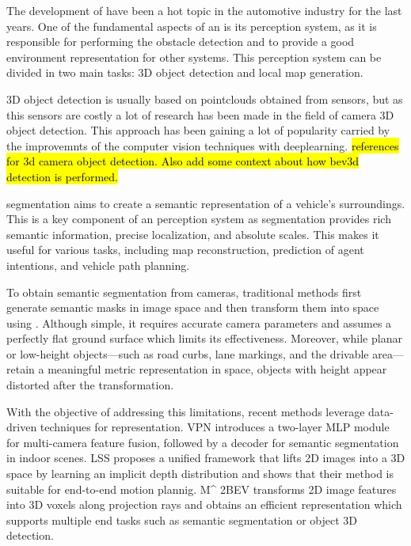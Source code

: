 
The development of  have been a hot topic in the automotive industry for the last years. One of the fundamental aspects of an  is its perception system, as it is responsible for performing the obstacle detection and to provide a good environment representation for other systems. This perception system can be divided in two main tasks: 3D object detection and local  map generation. 

3D object detection is usually based on pointclouds obtained from  sensors, but as this sensors are costly a lot of research has been made in the field of camera 3D object detection. This approach has been gaining a lot of popularity carried by the improvemnts of the computer vision techniques with deeplearning. \hl{references for 3d camera object detection. Also add some context about how bev3d detection is performed.}

 segmentation aims to create a semantic representation of a vehicle's surroundings. This is a key component of an  perception system as  segmentation provides rich semantic information, precise localization, and absolute scales. This makes it useful for various tasks, including map reconstruction, prediction of agent intentions, and vehicle path planning.

To obtain  semantic segmentation from cameras, traditional methods first generate semantic masks in image space and then transform them into  space using . Although simple, it requires accurate camera parameters and assumes a perfectly flat ground surface which limits its effectiveness. Moreover, while planar or low-height objects—such as road curbs, lane markings, and the drivable area—retain a meaningful metric representation in  space, objects with height appear distorted after the transformation.

With the objective of addressing this limitations, recent methods leverage data-driven techniques for  representation. VPN \cite{view_parsing_network} introduces a two-layer MLP module for multi-camera feature fusion, followed by a decoder for semantic segmentation in indoor scenes. LSS \cite{lift_splat_shoot} proposes a unified framework that lifts 2D images into a 3D space by learning an implicit depth distribution and shows that their method is suitable for end-to-end motion plannig. M\^{} 2BEV \cite{m2bev} transforms 2D image features into 3D voxels along projection rays and obtains an efficient  representation which supports multiple end tasks such as semantic segmentation or object 3D detection.




